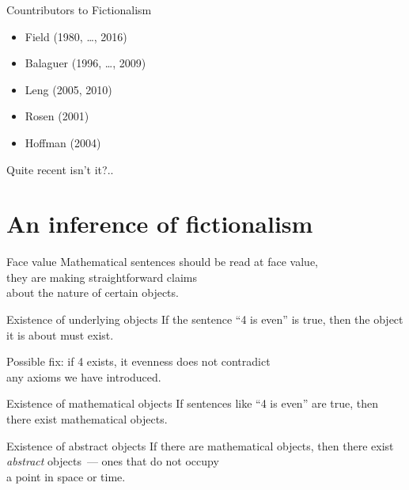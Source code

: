 \documentclass[12pt,aspectratio=169,svgnames]{beamer}
\begin{document}
\begin{frame}{Countributors to Fictionalism}
\begin{itemize}
	\item Field (1980, \ldots, 2016)
	\item Balaguer (1996, \ldots, 2009)
	\item Leng (2005, 2010)
	\item Rosen (2001)
	\item Hoffman (2004)
\end{itemize} \bigskip

	Quite recent isn't it?..
\end{frame}

\section{An inference of fictionalism}

\begin{frame}{Face value} \label{sl:fv}
	Mathematical sentences should be read at face value, \\
	they are making straightforward claims \\
	about the nature of certain objects.
\end{frame}

\begin{frame}{Existence of underlying objects} \label{sl:uex}
	If the sentence “4 is even” is true, then the object \\
	it is about must exist. \bigskip

	\textcolor{black!35!white}{
		Possible fix: if 4 exists, it evenness does not contradict \\
		any axioms we have introduced.}
\end{frame}

\begin{frame}{Existence of mathematical objects} \label{sl:mex}
	If sentences like “4 is even” are true, then \\
	there exist mathematical objects.
\end{frame}

\begin{frame}{Existence of abstract objects} \label{sl:abstract}
	If there are mathematical objects, then there exist \\
	{\it abstract} objects~— ones that do not occupy \\
	a point in space or time.
\end{frame}
\end{document}
